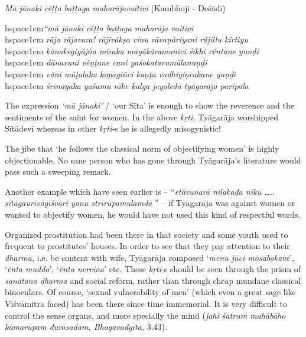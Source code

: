 \textit{Mā jānaki cêṭṭa baṭṭaga maharājavaitivi} (Kambhoji - Deśādi)

\begin{myquote}
hspace{1cm}\textit{“mā jānaki cêṭṭa baṭṭaga maharāja vaitivi}\\hspace{1cm} \textit{rāja rājavara! rājīvākṣa vinu rāvaṇāriyani rājillu kīrtiyu}\\hspace{1cm} \textit{kānakegiyājña mīraka māyākāramunici śikhi cêntane yunḍi}\\hspace{1cm} \textit{dānavuni vêṇṭane cani yaśokatarumūlanuṇḍi}\\hspace{1cm} \textit{vāni māṭalaku kopagiñci kaṇṭa vadhiyiṇcakane yuṇḍi} \\hspace{1cm} \textit{śrīnāyaka yaśamu nīke kalga jeyaledā tyāgarāja paripāla}
\end{myquote}

The expression \textit{‘mā jānaki’} / ‘our Sīta’ is enough to show the reverence and the sentiments of the saint for women. In the above \textit{kṛti,} Tyāgarāja worshipped Sītādevī whereas in other \textit{kṛti}-s he is allegedly misogynistic! 

The jibe that ‘he follows the classical norm of objectifying women’ is highly objectionable. No sane person who has gone through Tyāgarāja’s literature would pass such a sweeping remark. 

Another example which have seen earlier is – “\textit{etāvunarā nilakaḍa nīku ….. sītāgaurīvāgīśvari yanu strīrūpamulamdā} ” – if Tyāgarāja was against women or wanted to objectify women, he would have not used this kind of respectful words.

Organized prostitution had been there in that society and some youth used to frequent to prostitutes’ houses. In order to see that they pay attention to their \textit{dharma}, i.e. be content with wife, Tyāgarāja composed ‘\textit{menu jūci mosabokave}’, ‘\textit{ênta muddo}’, ‘\textit{ênta nercina}’ etc. These \textit{kṛti}-s should be seen through the prism of \textit{sanātana dharma} and social reform, rather than through cheap mundane classical binoculars. Of course, ‘sexual vulnerability of men’ (which even a great sage like Viśvāmitra faced) has been there since time immemorial. It is very difficult to control the sense organs, and more specially the mind (\textit{jahi śatruṁ mahābāho kāmarūpam durāsadam, Bhagavadgītā,} 3.43).


